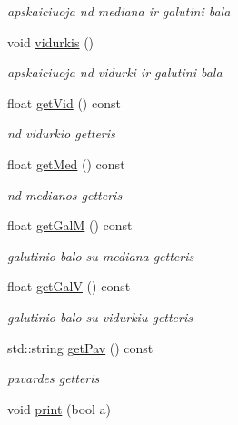 \begin{DoxyCompactItemize}
\begin{DoxyCompactList}\small\item\em apskaiciuoja nd mediana ir galutini bala \end{DoxyCompactList}\item 
\mbox{\label{classstudentai_a77b16e0d365f9e3d875979bec7852d8b}} 
void \mbox{\hyperlink{classstudentai_a77b16e0d365f9e3d875979bec7852d8b}{vidurkis}} ()
\begin{DoxyCompactList}\small\item\em apskaiciuoja nd vidurki ir galutini bala \end{DoxyCompactList}\item 
\mbox{\label{classstudentai_aefe279e7b3b4dd339cae30c0ad4479ff}} 
float \mbox{\hyperlink{classstudentai_aefe279e7b3b4dd339cae30c0ad4479ff}{get\+Vid}} () const
\begin{DoxyCompactList}\small\item\em nd vidurkio getter\textquotesingle{}is \end{DoxyCompactList}\item 
\mbox{\label{classstudentai_a2c27385f7a134a94650fc21d40d10174}} 
float \mbox{\hyperlink{classstudentai_a2c27385f7a134a94650fc21d40d10174}{get\+Med}} () const
\begin{DoxyCompactList}\small\item\em nd medianos getter\textquotesingle{}is \end{DoxyCompactList}\item 
\mbox{\label{classstudentai_a5fe575f8a1cc72a1e702e36e7de99b82}} 
float \mbox{\hyperlink{classstudentai_a5fe575f8a1cc72a1e702e36e7de99b82}{get\+GalM}} () const
\begin{DoxyCompactList}\small\item\em galutinio balo su mediana getter\textquotesingle{}is \end{DoxyCompactList}\item 
\mbox{\label{classstudentai_a8c868cbb588226fff00d8bf3b08fdc3a}} 
float \mbox{\hyperlink{classstudentai_a8c868cbb588226fff00d8bf3b08fdc3a}{get\+GalV}} () const
\begin{DoxyCompactList}\small\item\em galutinio balo su vidurkiu getter\textquotesingle{}is \end{DoxyCompactList}\item 
\mbox{\label{classstudentai_a3c94d399fd414f5c3fbaaf591e6445ff}} 
std\+::string \mbox{\hyperlink{classstudentai_a3c94d399fd414f5c3fbaaf591e6445ff}{get\+Pav}} () const
\begin{DoxyCompactList}\small\item\em pavardes getter\textquotesingle{}is \end{DoxyCompactList}\item 
void \mbox{\hyperlink{classstudentai_ac48600dd1f684ec6538c7797e7463690}{print}} (bool a)
\end{DoxyCompactItemize}
